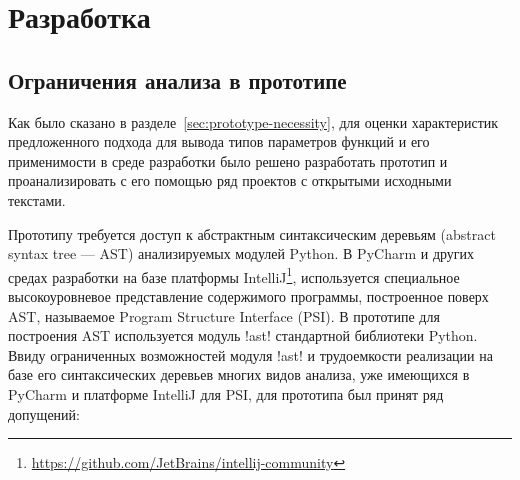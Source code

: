 \chapter{Разработка}
\label{sec:development}

\section{Ограничения анализа в прототипе}
\label{sec:prototype-limits}

Как было сказано в разделе~\ref{sec:prototype-necessity}, для оценки
характеристик предложенного подхода для вывода типов параметров функций и его
применимости в среде разработки было решено разработать прототип и
проанализировать с его помощью ряд проектов с открытыми исходными текстами.

Прототипу требуется доступ к абстрактным синтаксическим деревьям (abstract
syntax tree --- AST) анализируемых модулей Python. В PyCharm и других средах
разработки на базе платформы
IntelliJ\footnote{\url{https://github.com/JetBrains/intellij-community}},
используется специальное высокоуровневое представление содержимого программы,
построенное поверх AST, называемое Program Structure Interface (PSI). 
В прототипе для построения AST используется модуль !ast! стандартной библиотеки
Python. Ввиду ограниченных возможностей модуля !ast! и трудоемкости реализации на
базе его синтаксических деревьев многих видов анализа, уже имеющихся в PyCharm и
платформе IntelliJ для PSI, для прототипа был принят ряд допущений:

